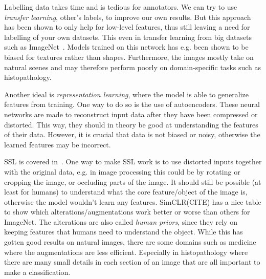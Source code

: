 \documentclass[10pt,twocolumn,letterpaper]{article}
\begin{document}
Labelling data takes time and is tedious for annotators. We can try to use \textit{transfer learning}, other's labels, to improve our own results. But this approach has been shown to only help for low-level features, thus still leaving a need for labelling of your own datasets. This even in transfer learning from big datasets such as ImageNet~\cite{imageNet}. Models trained on this network has e.g. been shown to be biased for textures rather than shapes. Furthermore, the images mostly take on natural scenes and may therefore perform poorly on domain-specific tasks such as histopathology.

Another ideal is \textit{representation learning}, where the model is able to generalize features from training. One way to do so is the use of autoencoders. These neural networks are made to reconstruct input data after they have been compressed or distorted. This way, they should in theory be good at understanding the features of their data. However, it is crucial that data is not biased or noisy, otherwise the learned features may be incorrect.

\gls{SSL} is covered in~. One way to make \gls{SSL} work is to use distorted inputs together with the original data, e.g. in image processing this could be by rotating or cropping the image, or occluding parts of the image. It should still be possible (at least for humans) to understand what the core feature/object of the image is, otherwise the model wouldn't learn any features. SimCLR(CITE) has a nice table to show which alterations/augmentations work better or worse than others for ImageNet. The alterations are also called \textit{human priors}, since they rely on keeping features that humans need to understand the object. While this has gotten good results on natural images, there are some domains such as medicine where the augmentations are less efficient. Especially in histopathology where there are many small details in each section of an image that are all important to make a classification.
\end{document}
